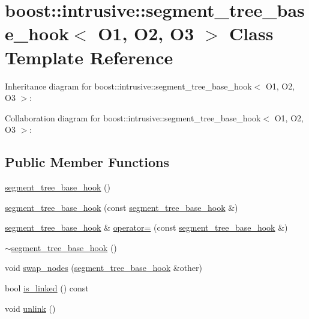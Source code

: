 \hypertarget{classboost_1_1intrusive_1_1segment__tree__base__hook}{}\section{boost\+:\+:intrusive\+:\+:segment\+\_\+tree\+\_\+base\+\_\+hook$<$ O1, O2, O3 $>$ Class Template Reference}
\label{classboost_1_1intrusive_1_1segment__tree__base__hook}


Inheritance diagram for boost\+:\+:intrusive\+:\+:segment\+\_\+tree\+\_\+base\+\_\+hook$<$ O1, O2, O3 $>$\+:


Collaboration diagram for boost\+:\+:intrusive\+:\+:segment\+\_\+tree\+\_\+base\+\_\+hook$<$ O1, O2, O3 $>$\+:
\subsection*{Public Member Functions}
\begin{DoxyCompactItemize}
\item 
\hyperlink{classboost_1_1intrusive_1_1segment__tree__base__hook_a05cca2dfb1187df59458f74e582dbe24}{segment\+\_\+tree\+\_\+base\+\_\+hook} ()
\item 
\hyperlink{classboost_1_1intrusive_1_1segment__tree__base__hook_a62ff8e9e17018de32ebdf3cfaefef2a4}{segment\+\_\+tree\+\_\+base\+\_\+hook} (const \hyperlink{classboost_1_1intrusive_1_1segment__tree__base__hook}{segment\+\_\+tree\+\_\+base\+\_\+hook} \&)
\item 
\hyperlink{classboost_1_1intrusive_1_1segment__tree__base__hook}{segment\+\_\+tree\+\_\+base\+\_\+hook} \& \hyperlink{classboost_1_1intrusive_1_1segment__tree__base__hook_af7ba30a6fe62f2870197836df44f1ff9}{operator=} (const \hyperlink{classboost_1_1intrusive_1_1segment__tree__base__hook}{segment\+\_\+tree\+\_\+base\+\_\+hook} \&)
\item 
\hyperlink{classboost_1_1intrusive_1_1segment__tree__base__hook_a85af62343b5a68ef5fd830dd48e4c1d1}{$\sim$segment\+\_\+tree\+\_\+base\+\_\+hook} ()
\item 
void \hyperlink{classboost_1_1intrusive_1_1segment__tree__base__hook_ab222e050b45faf013ebbd52d932cff39}{swap\+\_\+nodes} (\hyperlink{classboost_1_1intrusive_1_1segment__tree__base__hook}{segment\+\_\+tree\+\_\+base\+\_\+hook} \&other)
\item 
bool \hyperlink{classboost_1_1intrusive_1_1segment__tree__base__hook_aacea6fce2437d1e3a30219fe4292bbb5}{is\+\_\+linked} () const
\item 
void \hyperlink{classboost_1_1intrusive_1_1segment__tree__base__hook_a6858bb144c5c5f2e8ae256ac7a44b46d}{unlink} ()
\end{DoxyCompactItemize}



